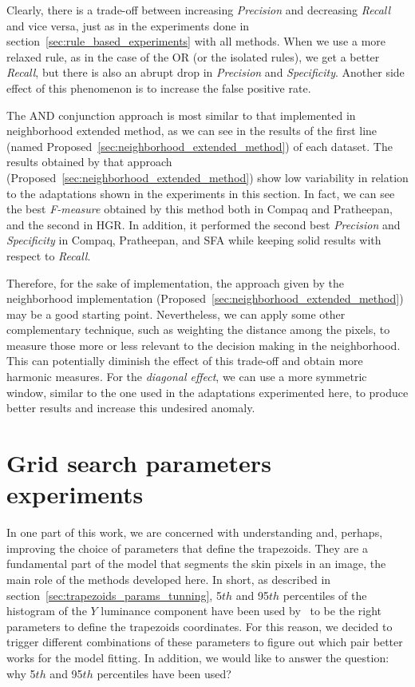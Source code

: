 Clearly, there is a trade-off between increasing \emph{Precision} and decreasing \emph{Recall} and vice versa, just as in the experiments done in section~\ref{sec:rule_based_experiments} with all methods. When we use a more relaxed rule, as in the case of the OR (or the isolated rules), we get a better \emph{Recall}, but there is also an abrupt drop in \emph{Precision} and \emph{Specificity}. Another side effect of this phenomenon is to increase the false positive rate.

The AND conjunction approach is most similar to that implemented in neighborhood extended method, as we can see in the results of the first line (named Proposed~\ref{sec:neighborhood_extended_method}) of each dataset. The results obtained by that approach (Proposed~\ref{sec:neighborhood_extended_method}) show low variability in relation to the adaptations shown in the experiments in this section. In fact, we can see the best \emph{F-measure} obtained by this method both in Compaq and Pratheepan, and the second in HGR. In addition, it performed the second best \emph{Precision} and \emph{Specificity} in Compaq, Pratheepan, and SFA while keeping solid results with respect to \emph{Recall}.

Therefore, for the sake of implementation, the approach given by the neighborhood implementation (Proposed~\ref{sec:neighborhood_extended_method}) may be a good starting point. Nevertheless, we can apply some other complementary technique, such as weighting the distance among the pixels, to measure those more or less relevant to the decision making in the neighborhood. This can potentially diminish the effect of this trade-off and obtain more harmonic measures. For the \textit{diagonal effect}, we can use a more symmetric window, similar to the one used in the adaptations experimented here, to produce better results and increase this undesired anomaly.


\section{Grid search parameters experiments}
\label{sec:grid_search_experiments}
In one part of this work, we are concerned with understanding and, perhaps, improving the choice of parameters that define the trapezoids. They are a fundamental part of the model that segments the skin pixels in an image, the main role of the methods developed here. In short, as described in section~\ref{sec:trapezoids_params_tunning}, 5${th}$ and 95$th$ percentiles of the histogram of the $Y$ luminance component have been used by~\citet{brancati:17} to be the right parameters to define the trapezoids coordinates. For this reason, we decided to trigger different combinations of these parameters to figure out which pair better works for the model fitting. In addition, we would like to answer the question: why 5${th}$ and 95$th$ percentiles have been used?

